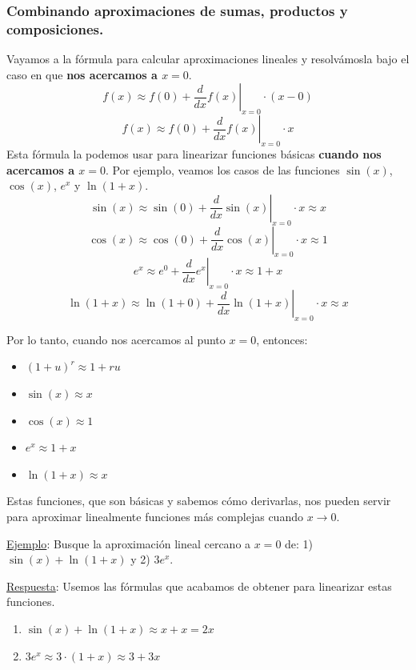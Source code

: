 \documentclass[12pt]{article}
\begin{document}
\subsubsection{Combinando aproximaciones de sumas, productos y composiciones.}

Vayamos a la fórmula para calcular aproximaciones lineales y resolvámosla bajo el caso en que \textbf{nos acercamos a $x = 0$}.
\[f(x) \approx f(0) + \left. \frac{d}{dx} f(x) \right|_{x = 0} \cdot (x - 0)\]
\[f(x) \approx f(0) + \left. \frac{d}{dx} f(x) \right|_{x = 0} \cdot x\]
Esta fórmula la podemos usar para linearizar funciones básicas \textbf{cuando nos acercamos a $x = 0$}. Por ejemplo, veamos los casos de las funciones $\sin(x)$, $\cos(x)$, $e^{x}$ y $\ln(1 + x)$.
\[\sin(x) \approx \sin(0) + \left. \frac{d}{dx} \sin(x) \right|_{x = 0} \cdot x \approx x\]
\[\cos(x) \approx \cos(0) + \left. \frac{d}{dx} \cos(x) \right|_{x = 0} \cdot x \approx 1\]
\[e^{x} \approx e^{0} + \left. \frac{d}{dx} e^{x} \right|_{x = 0} \cdot x \approx 1 + x\]
\[\ln(1 + x) \approx \ln(1 + 0) + \left. \frac{d}{dx} \ln(1 + x) \right|_{x = 0} \cdot x \approx x\]

\newpage

Por lo tanto, cuando nos acercamos al punto $x = 0$, entonces:

\begin{itemize}
\item $(1 + u)^{r} \approx 1 + ru$
\item $\sin(x) \approx x$
\item $\cos(x) \approx 1$
\item $e^{x} \approx 1 + x$
\item $\ln(1 + x) \approx x$
\end{itemize}

Estas funciones, que son básicas y sabemos cómo derivarlas, nos pueden servir para aproximar linealmente funciones más complejas cuando $x \to 0$.

\underline{Ejemplo}: Busque la aproximación lineal cercano a $x = 0$ de: 1) $\sin(x) + \ln(1 + x)$ y 2) $3e^{x}$.

\underline{Respuesta}: Usemos las fórmulas que acabamos de obtener para linearizar estas funciones.

\begin{enumerate}
\item $\sin(x) + \ln(1 + x) \approx x + x = 2x$
\item $3e^{x} \approx 3 \cdot (1 + x) \approx 3 + 3x$
\end{enumerate}
\end{document}
